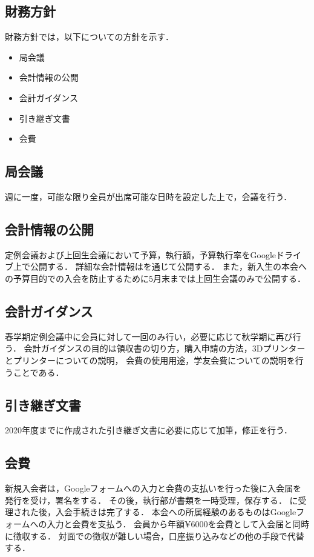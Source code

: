 \subsection*{財務方針}


財務方針では，以下についての方針を示す．
\begin{itemize}
  \item 局会議
  \item 会計情報の公開
  \item 会計ガイダンス
  \item 引き継ぎ文書
  \item 会費
\end{itemize}

\subsection*{局会議}
週に一度，可能な限り\kaikeiStaff{}全員が出席可能な日時を設定した上で，会議を行う．

\subsection*{会計情報の公開}
定例会議および上回生会議において予算，執行額，予算執行率をGoogleドライブ上で公開する．
詳細な会計情報は\kaikeiStaff{}を通じて公開する．
また，新入生の本会への予算目的での入会を防止するために5月末までは上回生会議のみで公開する．

\subsection*{会計ガイダンス}
春学期定例会議中に会員に対して一回のみ行い，必要に応じて秋学期に再び行う．
会計ガイダンスの目的は領収書の切り方，購入申請の方法，3Dプリンターとプリンターについての説明，
会費の使用用途，学友会費についての説明を行うことである．

\subsection*{引き継ぎ文書}
2020年度までに作成された引き継ぎ文書に必要に応じて加筆，修正を行う．

\subsection*{会費}
新規入会者は，Googleフォームへの入力と会費の支払いを行った後に入会届を発行を受け，署名をする．
その後，執行部が書類を一時受理，保存する．
\president{}に受理された後，入会手続きは完了する．
本会への所属経験のあるものはGoogleフォームへの入力と会費を支払う．
会員から年額¥6000を会費として入会届と同時に徴収する．
対面での徴収が難しい場合，口座振り込みなどの他の手段で代替する．
